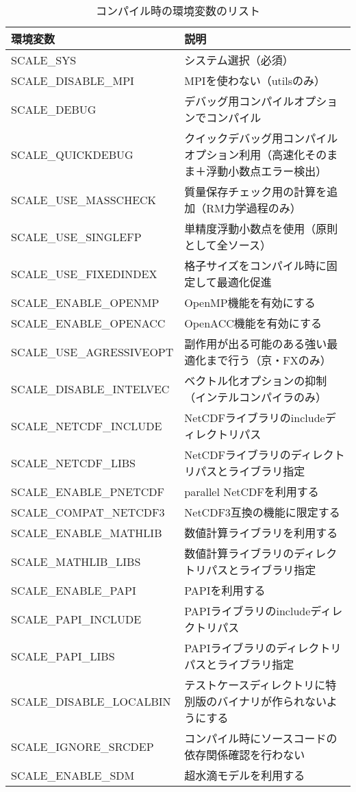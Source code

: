 \begin{table}[htb]
\begin{center}
\caption{コンパイル時の環境変数のリスト}
\begin{tabularx}{150mm}{|l|X|} \hline
 \rowcolor[gray]{0.9} 環境変数 & 説明  \\ \hline
 SCALE\_SYS               & システム選択（必須）  \\ \hline
 SCALE\_DISABLE\_MPI      & MPIを使わない（utilsのみ）  \\ \hline
 SCALE\_DEBUG             & デバッグ用コンパイルオプションでコンパイル  \\ \hline
 SCALE\_QUICKDEBUG        & クイックデバッグ用コンパイルオプション利用（高速化そのまま＋浮動小数点エラー検出）  \\ \hline
 SCALE\_USE\_MASSCHECK    & 質量保存チェック用の計算を追加（RM力学過程のみ）  \\ \hline
 SCALE\_USE\_SINGLEFP     & 単精度浮動小数点を使用（原則として全ソース）  \\ \hline
 SCALE\_USE\_FIXEDINDEX   & 格子サイズをコンパイル時に固定して最適化促進  \\ \hline
 SCALE\_ENABLE\_OPENMP    & OpenMP機能を有効にする  \\ \hline
 SCALE\_ENABLE\_OPENACC   & OpenACC機能を有効にする  \\ \hline
 SCALE\_USE\_AGRESSIVEOPT & 副作用が出る可能のある強い最適化まで行う（京・FXのみ）  \\ \hline
 SCALE\_DISABLE\_INTELVEC & ベクトル化オプションの抑制（インテルコンパイラのみ）  \\ \hline
 SCALE\_NETCDF\_INCLUDE   & NetCDFライブラリのincludeディレクトリパス  \\ \hline
 SCALE\_NETCDF\_LIBS      & NetCDFライブラリのディレクトリパスとライブラリ指定  \\ \hline
 SCALE\_ENABLE\_PNETCDF   & parallel NetCDFを利用する  \\ \hline
 SCALE\_COMPAT\_NETCDF3   & NetCDF3互換の機能に限定する  \\ \hline
 SCALE\_ENABLE\_MATHLIB   & 数値計算ライブラリを利用する  \\ \hline
 SCALE\_MATHLIB\_LIBS     & 数値計算ライブラリのディレクトリパスとライブラリ指定  \\ \hline
 SCALE\_ENABLE\_PAPI      & PAPIを利用する  \\ \hline
 SCALE\_PAPI\_INCLUDE     & PAPIライブラリのincludeディレクトリパス  \\ \hline
 SCALE\_PAPI\_LIBS        & PAPIライブラリのディレクトリパスとライブラリ指定  \\ \hline
 SCALE\_DISABLE\_LOCALBIN & テストケースディレクトリに特別版のバイナリが作られないようにする  \\ \hline
 SCALE\_IGNORE\_SRCDEP    & コンパイル時にソースコードの依存関係確認を行わない  \\ \hline
 SCALE\_ENABLE\_SDM       & 超水滴モデルを利用する   \\ \hline
\end{tabularx}
\label{tab:env_var_list}
\end{center}
\end{table}

